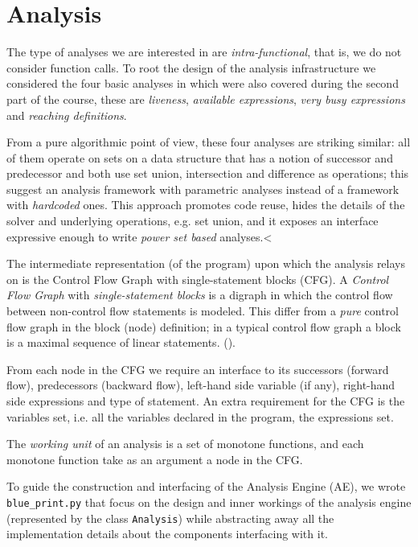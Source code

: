 \section{Analysis}

The type of analyses we are interested in are \emph{intra-functional}, that is, we do not consider function calls. To root the design of the analysis infrastructure
we considered the four basic analyses in \cite{spa} which were also covered during the second part of the course, these are \emph{liveness}, \emph{available expressions},
\emph{very busy expressions} and \emph{reaching definitions}. 

From a pure algorithmic point of view, these four analyses are striking similar: all of them operate on sets on a data structure that has a notion of successor and predecessor 
and both use set union, intersection and difference as operations; this suggest an analysis framework with parametric analyses instead of a framework with \emph{hardcoded}
ones. This approach promotes code reuse, hides the details of the solver and underlying operations, e.g. set union, and it exposes an interface expressive enough to
write \emph{power set based} analyses.<


The intermediate representation (of the program) upon which the analysis relays on is the Control Flow Graph with single-statement blocks (CFG). A \emph{Control Flow Graph} with \emph{single-statement blocks} is a digraph in which the control flow between non-control flow statements is modeled. This differ from a \emph{pure} control flow graph in the block (node) definition; in a typical control flow graph a block is a maximal sequence of linear statements. (\cite{cooper}).

From each node in the CFG we require an interface to its successors (forward flow), predecessors (backward flow), left-hand side variable (if any), right-hand side expressions and type of statement.
An extra requirement for the CFG is the variables set, i.e. all the variables declared in the program, the expressions set.

The \emph{working unit} of an analysis is a set of monotone functions, and each monotone function take as an argument a node in the CFG. 

To guide the construction and interfacing of the Analysis Engine (AE), we wrote \lstinline{blue_print.py} that focus on the design and inner workings of the analysis engine (represented by the class \lstinline{Analysis}) while abstracting away all the implementation details about the components interfacing with it. 

